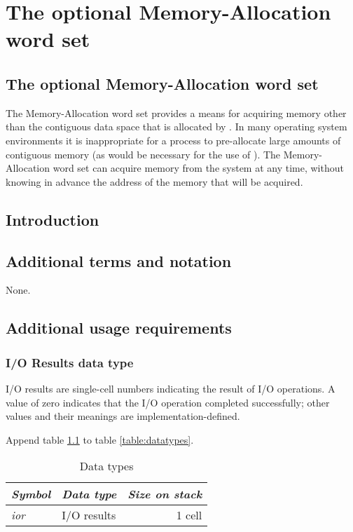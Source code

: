 \chapter{The optional Memory-Allocation word set} %

\begin{info}
\section{The optional Memory-Allocation word set} %

The Memory-Allocation word set provides a means for acquiring memory
other than the contiguous data space that is allocated by
. In many operating system environments it is
inappropriate for a process to pre-allocate large amounts of contiguous
memory (as would be necessary for the use of ). The
Memory-Allocation word set can acquire memory from the system at any
time, without knowing in advance the address of the memory that will
be acquired.
\end{info}

\section{Introduction} %

\section{Additional terms and notation} %
None.

\section{Additional usage requirements} %

\subsection{I/O Results data type} %
\label{mem:ior}

I/O results are single-cell numbers indicating the result of I/O
operations. A value of zero indicates that the I/O operation
completed successfully; other values and their meanings are
implementation-defined.

Append table \ref{mem:types} to table \ref{table:datatypes}.

\begin{table}[h]
  \begin{center}
	\caption{Data types}
	\label{mem:types}
	\begin{tabular}{llr}
	\hline\hline
	\emph{Symbol} & \emph{Data type} & \emph{Size on stack} \\
	\hline
	\emph{ior}		& I/O results			& 1 cell \\
	\hline\hline
	\end{tabular}
  \end{center}
\end{table}


